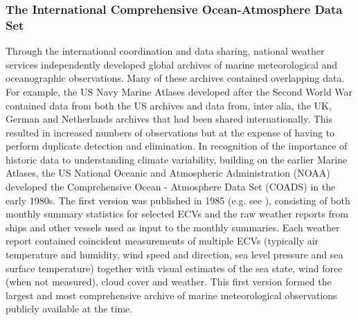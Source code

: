 \subsubsection{The International Comprehensive Ocean-Atmosphere Data Set}
Through the international coordination and data sharing, national weather services independently developed global archives of marine meteorological and oceanographic observations.
Many of these archives contained overlapping data. 
For example, the US Navy Marine Atlases developed after the Second World War contained data from both the US archives and data from, inter alia, the UK, German and Netherlands archives that had been shared internationally. 
This resulted in increased numbers of observations but at the expense of having to perform duplicate detection and elimination.
In recognition of the importance of historic data to understanding climate variability, building on the earlier Marine Atlases, the US National Oceanic and Atmospheric Administration (NOAA) developed the Comprehensive Ocean - Atmosphere Data Set (COADS) in the early 1980s.
The first version was published in 1985 (e.g. see \cite{Woodruff1987}), consisting of both monthly summary statistics for selected ECVs and the raw weather reports from ships and other vessels used as input to the monthly summaries.
Each weather report contained coincident measurements of multiple ECVs (typically air temperature and humidity, wind speed and direction, sea level pressure and sea surface temperature) together with visual estimates of the sea state, wind force (when not measured), cloud cover and weather. 
This first version formed the largest and most comprehensive archive of marine meteorological observations publicly available at the time. 

